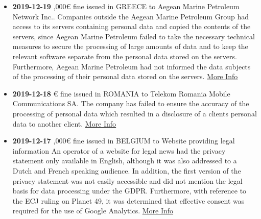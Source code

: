 \documentclass[12pt]{article}
\begin{document}
\newpage
\justify
	\begin{multicols}{2}
		\begin{itemize}
			\item \textbf{2019-12-19} ,000€ fine issued in GREECE to Aegean Marine Petroleum Network Inc..
			\newline
			Companies outside the Aegean Marine Petroleum Group had access to its servers containing personal data and copied the contents of the servers, since Aegean Marine Petroleum failed to take the necessary technical measures to secure the processing of large amounts of data and to keep the relevant software separate from the personal data stored on the servers. Furthermore, Aegean Marine Petroleum had not informed the data subjects of the processing of their personal data stored on the servers.
			\newline
			\href{http://www.dpa.gr/APDPXPortlets/htdocs/documentDisplay.jsp?docid=205,136,113,56,60,108,243,88}{More Info}
			\vspace{1cm}
	
			\item \textbf{2019-12-18} € fine issued in ROMANIA to Telekom Romania Mobile Communications SA.
			\newline
			The company has failed to ensure the accuracy of the processing of personal data which resulted in a disclosure of a clients personal data to another client.
			\newline
			\href{https://www.dataprotection.ro/?page=O_noua_amenda_pentru_incalcarea_RGPD_comunicat_decembrie&lang=ro}{More Info}
			\vspace{1cm}
	
			\item \textbf{2019-12-17} ,000€ fine issued in BELGIUM to Website providing legal information
			\newline
			An operator of a website for legal news had the privacy statement only available in English, although it was also addressed to a Dutch and French speaking audience. In addition, the first version of the privacy statement was not easily accessible and did not mention the legal basis for data processing under the GDPR. Furthermore, with reference to the ECJ ruling on Planet 49, it was determined that effective consent was required for the use of Google Analytics.
			\newline
			\href{https://www.gegevensbeschermingsautoriteit.be/sites/privacycommission/files/documents/BETG_12-2019_NL.PDF}{More Info}
		\end{itemize}
	\end{multicols}
\end{document}
